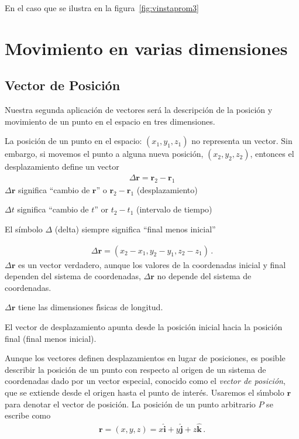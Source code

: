 En el caso que se ilustra en la figura~\ref{fig:vinstaprom3}

\section{Movimiento en varias dimensiones}

\subsection{Vector de Posición}
Nuestra segunda aplicaci\'on de vectores ser\'a la descripci\'on  de la posici\'on y movimiento de un punto en el espacio en tres dimensiones. 

La posici\'on de un punto en el espacio: $(x_1,y_1,z_1)$ no representa un vector. Sin embargo, si movemos el punto a alguna nueva posici\'on, $(x_2,y_2,z_2)$, entonces el desplazamiento define un vector 
\begin{align}
  \Delta \mathbf{r}=\mathbf{r}_2-\mathbf{r}_1
\end{align}
$\Delta\mathbf{r}$ significa ``cambio de $\mathbf{r}$'' o $\mathbf{r}_2-\mathbf{r}_1$ (desplazamiento)

$\Delta t$ significa ``cambio de $t$'' or $t_2-t_1$ (intervalo de tiempo)

El símbolo $\Delta$ (delta) siempre significa ``final menos inicial''

\begin{align}
  \Delta\mathbf{r}=(x_2-x_1,y_2-y_1,z_2-z_1)\,.
\end{align}
$\Delta\mathbf{r}$ es un vector verdadero, aunque los valores de la coordenadas inicial y final dependen del sistema de coordenadas, $\Delta\mathbf{r}$ no depende del sistema de coordenadas. 

$\Delta\mathbf{r}$ tiene las dimensiones f\'\i sicas de longitud. 


El vector de desplazamiento apunta desde la posición inicial hacia la posición final (final menos inicial).


Aunque los vectores definen desplazamientos en lugar de posiciones, es posible describir la posici\'on de un punto con respecto al origen de un sistema de coordenadas dado por un vector especial, conocido como el \emph{vector de posici\'on}, que se extiende desde el origen hasta el punto de inter\'es. Usaremos el s\'\i mbolo $\mathbf{r}$ para denotar el vector de posici\'on. La posici\'on de un punto arbitrario $P$ se escribe como
\begin{align}
  \mathbf{r}=(x,y,z)=x\hat{\mathbf{i}}+
  y\hat{\mathbf{j}}+z\hat{\mathbf{k}}\,.
\end{align}

